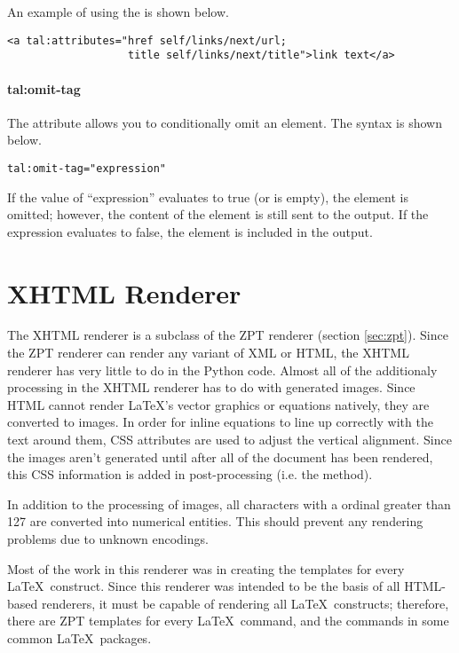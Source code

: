 An example of using the  is shown below.
\begin{verbatim}
<a tal:attributes="href self/links/next/url; 
                   title self/links/next/title">link text</a>
\end{verbatim}


\paragraph{tal:omit-tag}

The  attribute allows you to conditionally omit an
element.  The syntax is shown below.
\begin{verbatim}
tal:omit-tag="expression"
\end{verbatim}

If the value of ``expression'' evaluates to true (or is empty), the element 
is omitted; however, the content of the element is still sent to the output.
If the expression evaluates to false, the element is included in the 
output.


\section{XHTML Renderer}

The XHTML renderer is a subclass of the ZPT renderer (section \ref{sec:zpt}).
Since the ZPT renderer can render any variant of XML or HTML, the 
XHTML renderer has very little to do in the Python code.  Almost all
of the additionaly processing in the XHTML renderer has to do with
generated images.  Since HTML cannot render \LaTeX's vector graphics
or equations natively, they are converted to images.  In order for 
inline equations to line up correctly with the text around them, CSS
attributes are used to adjust the vertical alignment.  Since the images
aren't generated until after all of the document has been rendered,
this CSS information is added in post-processing (i.e. the  
method).

In addition to the processing of images, all characters with a ordinal
greater than 127 are converted into numerical entities.  This should 
prevent any rendering problems due to unknown encodings.

Most of the work in this renderer was in creating the templates for 
every \LaTeX\ construct.  Since this renderer was intended to be the
basis of all HTML-based renderers, it must be capable of rendering
all \LaTeX\ constructs; therefore, there are ZPT templates for every
\LaTeX\ command, and the commands in some common \LaTeX\ packages.

